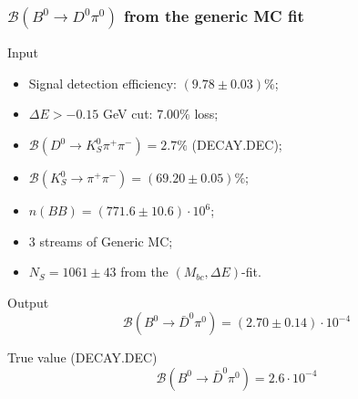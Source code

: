 \documentclass[10 pt,compress,mathserif]{beamer}
\newcommand{\dkspp}{\ensuremath{D^0\to K_S^0\pi^+\pi^-}\xspace}
\newcommand{\bdpi}{\ensuremath{B^0\to \bar D^0\pi^0}\xspace}
\begin{document}
\begin{frame}
 \frametitle{$\mathcal{B}\left(B^0\to D^0\pi^0\right)$ from the generic MC fit}
 \begin{block}{Input}
  \begin{itemize}
  \item Signal detection efficiency: $(9.78\pm0.03)\%$;
  \item $\Delta E>-0.15$ GeV cut: $7.00\%$ loss;
  \item $\mathcal{B}(\dkspp) = 2.7\%$ (DECAY.DEC);
  \item $\mathcal{B}(K_S^0\to\pi^+\pi^-) = (69.20\pm0.05)\%$;
  \item $n(BB) = (771.6\pm10.6)\cdot 10^6$;
  \item $3$ streams of Generic MC;
  \item $N_S=1061\pm43$ from the $(M_{bc},\Delta E)$-fit.
 \end{itemize}
 \end{block}

 \begin{block}{Output}
 \begin{equation*}
  \mathcal{B}\left(\bdpi\right) = (2.70\pm0.14)\cdot 10^{-4}
 \end{equation*}
 \end{block}

 \begin{block}{True value (DECAY.DEC)}
 \begin{equation*}
  \mathcal{B}\left(\bdpi\right) = 2.6\cdot 10^{-4}
 \end{equation*}
 \end{block}
\end{frame}
\end{document}
